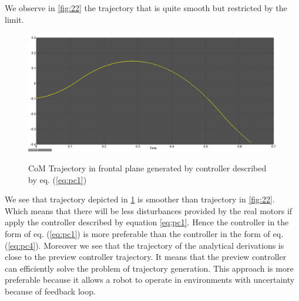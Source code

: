 \documentclass[12pt,a4paper]{report}
\begin{document}
		 	We observe in \cref{fig:22} the trajectory that is quite smooth but restricted by the limit.
		 	
		 	\begin{figure}[H]
		 		\vspace{-0.2cm}
		 		\centering
		 		{\includegraphics[width=1\textwidth]{23}}
		 		\caption{CoM  Trajectory in frontal plane generated by controller described by eq. (\ref{eq:pc1})}
		 		\label{fig:23}
		 		\vspace{-0.1cm}
		 	\end{figure}
		 	
		 	We see that trajectory depicted in \cref{fig:23} is smoother than trajectory in \cref{fig:22}. Which means that there will be less disturbances provided by the real motors if apply the controller described by equation \ref{eq:pc1}. Hence the controller in the form of eq. (\ref{eq:pc1}) is more preferable than the controller in the form of eq. (\ref{eq:pc4}).
		 	Moreover we see that the trajectory of the analytical derivations is close to the preview controller trajectory. It means that the preview controller can efficiently solve the problem of trajectory generation. This approach is more preferable because it allows a robot to operate in environments with uncertainty because of feedback loop.
\end{document}
